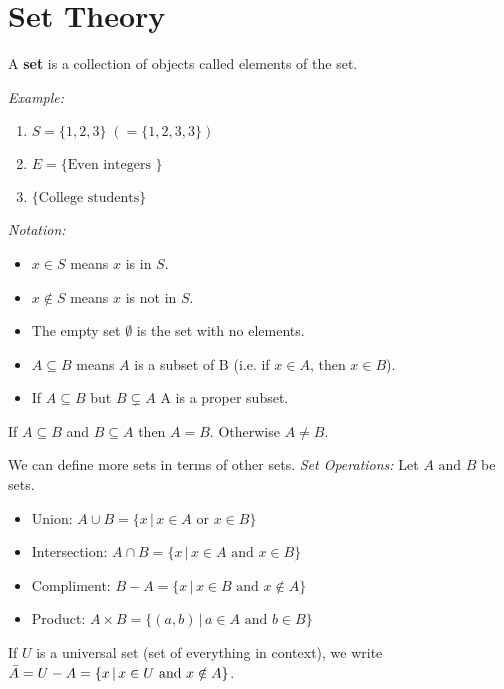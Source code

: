 \documentclass[../main.tex]{subfiles}
\begin{document}
\section{Set Theory}

\begin{definition}[Set]
    A \textbf{set} is a collection of objects called elements of the set.
\end{definition}

\textit{Example:}
\begin{enumerate}
    \item \( S = \{ 1, 2, 3 \} \; (= \{ 1,2,3,3 \}) \)
    \item \( E = \{ \text{Even integers } \} \)
    \item \( \{ \text{College students} \} \)
\end{enumerate}

\textit{Notation:}
\begin{itemize}
    \item \( x \in S \) means \( x \) is in \( S \).
    \item \( x \notin S \) means \( x \) is not in \( S \).
    \item The empty set \( \emptyset \) is the set with no elements.
    \item \( A \subseteq B \) means \( A \) is a subset of B (i.e. if \( x \in A \), then \( x \in B \)).
    \item If \( A \subseteq B \) but \( B \subsetneq A \) A is a proper subset.
\end{itemize}

If \( A \subseteq B \) and \( B \subseteq A \) then \( A = B \). Otherwise \( A \neq B \).

We can define more sets in terms of other sets.
\textit{Set Operations:}
Let \( A \text{ and } B \) be sets.
\begin{itemize}
    \item Union: \( A \cup B  = \{ x \, | \, x \in A \text{ or } x \in B \}\)
    \item Intersection: \( A \cap B  = \{ x \, | \, x \in A \text{ and } x \in B \}\)
    \item Compliment: \( B - A = \{ x \, | \, x \in B \text{ and } x \notin A \} \)
    \item Product: \( A \times B = \{ (a, b) \, | \, a \in A \text{ and } b \in B \} \)
\end{itemize}

If \( U \) is a universal set (set of everything in context), we write
\( \bar{A} = U - A \\ = \{ x \, | \, x \in U \text{ and } x \notin A \} \).
\end{document}
